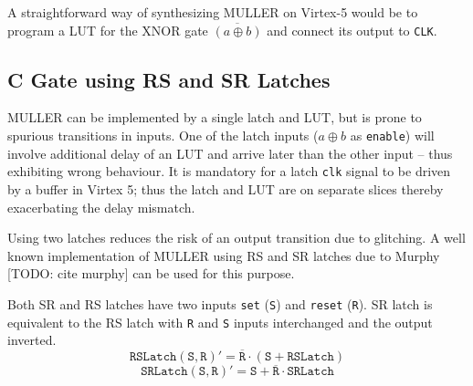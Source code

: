 A straightforward way of synthesizing MULLER on Virtex-5 would be to program
a LUT for the XNOR gate $\overline{(a \oplus b)}$ and connect its output to
\texttt{CLK}.

\subsection{C Gate using RS and SR Latches}

MULLER can be implemented by a single latch and LUT, but is prone
to spurious transitions in inputs. 
One of the latch inputs ($a \oplus b$ as \texttt{enable}) will involve 
additional delay of an LUT and arrive later than the other input -- thus exhibiting
wrong behaviour. It is mandatory for a latch \texttt{clk}
signal to be driven by a buffer in Virtex 5; thus the latch and LUT are on
separate slices thereby exacerbating the delay mismatch.

Using two latches reduces the risk of an output transition due to glitching.
A well known implementation of MULLER using RS and SR latches due to Murphy
[TODO: cite murphy] can be used for this purpose.

Both SR and RS latches have two inputs \texttt{set} (\texttt{S}) and
\texttt{reset} (\texttt{R}). 
SR latch is equivalent to the RS latch with \texttt{R} and \texttt{S} inputs
interchanged and the output inverted.
\begin{equation}\label{eq:rslatch}
	\texttt{RSLatch}(\texttt{S},\texttt{R})' 
	= \overline{\texttt{R}} \cdot (\texttt{S} + \texttt{RSLatch})
\end{equation}
\begin{equation}\label{eq:srlatch}
	\texttt{SRLatch}(\texttt{S},\texttt{R})' 
	= \texttt{S} + \overline{\texttt{R}} \cdot \texttt{SRLatch}
\end{equation}

